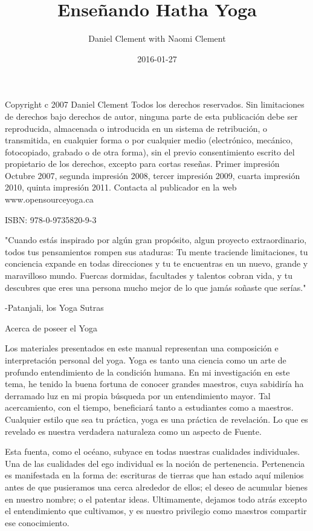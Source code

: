 \documentclass[a4paper]{article}
\title{Enseñando Hatha Yoga}
\date{2016-01-27}
\author{Daniel Clement with Naomi Clement}
\begin{document}
\maketitle

\newpage
Copyright c 2007 Daniel Clement
Todos los derechos reservados. Sin limitaciones de derechos bajo derechos de autor, ninguna parte de esta publicación debe ser reproducida, almacenada o introducida en un sistema de
retribución, o transmitida, en cualquier forma o por cualquier medio (electrónico, mecánico, fotocopiado, grabado o de otra forma), sin el previo consentimiento escrito del propietario de los derechos, excepto para cortas reseñas.
Primer impresión Octubre 2007, segunda impresión 2008, tercer impresión 2009, cuarta impresión 2010, quinta impresión 2011.
Contacta al publicador en la web www.opensourceyoga.ca

ISBN: 978-0-9735820-9-3

\newpage
\tableofcontents

\newpage
"Cuando estás inspirado por algún gran propósito, algun proyecto extraordinario, todos tus pensamientos rompen sus ataduras: Tu mente traciende limitaciones, tu conciencia expande en todas direcciones y tu te encuentras en un nuevo, grande y maravilloso mundo. Fuercas dormidas, facultades y talentos cobran vida, y tu descubres que eres una persona mucho mejor de lo que jamás soñaste que serías."

-Patanjali, los Yoga Sutras

\newpage
Acerca de poseer el Yoga

Los materiales presentados en este manual representan una composición e interpretación personal del yoga. Yoga es tanto una ciencia como un arte de profundo entendimiento de la condición humana. En mi investigación en este tema, he tenido la buena fortuna de conocer grandes maestros, cuya sabidiría ha derramado luz en mi propia búsqueda por un entendimiento mayor. Tal acercamiento, con el tiempo, beneficiará tanto a estudiantes como a maestros. Cualquier estilo que sea tu práctica, yoga es una práctica de revelación. Lo que es revelado es nuestra verdadera naturaleza como un aspecto de Fuente.

Esta fuenta, como el océano, subyace en todas nuestras cualidades individuales. Una de las cualidades del ego individual es la noción de pertenencia. Pertenencia es manifestada en la forma de: escrituras de tierras que han estado aquí milenios antes de que pusieramos una cerca alrededor de ellos; el deseo de acumular bienes en nuestro nombre; o el patentar ideas. Ultimamente, dejamos todo atrás excepto el entendimiento que cultivamos, y es nuestro privilegio como maestros compartir ese conocimiento.
\end{document}
